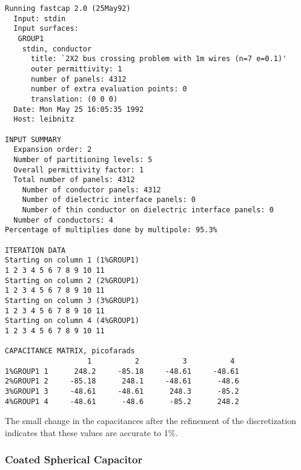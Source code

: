 \begin{verbatim}
Running fastcap 2.0 (25May92)
  Input: stdin
  Input surfaces:
   GROUP1
    stdin, conductor
      title: `2X2 bus crossing problem with 1m wires (n=7 e=0.1)'
      outer permittivity: 1
      number of panels: 4312
      number of extra evaluation points: 0
      translation: (0 0 0)
  Date: Mon May 25 16:05:35 1992
  Host: leibnitz

INPUT SUMMARY
  Expansion order: 2
  Number of partitioning levels: 5
  Overall permittivity factor: 1
  Total number of panels: 4312
    Number of conductor panels: 4312
    Number of dielectric interface panels: 0
    Number of thin conductor on dielectric interface panels: 0
  Number of conductors: 4
Percentage of multiplies done by multipole: 95.3%

ITERATION DATA
Starting on column 1 (1%GROUP1)
1 2 3 4 5 6 7 8 9 10 11
Starting on column 2 (2%GROUP1)
1 2 3 4 5 6 7 8 9 10 11
Starting on column 3 (3%GROUP1)
1 2 3 4 5 6 7 8 9 10 11
Starting on column 4 (4%GROUP1)
1 2 3 4 5 6 7 8 9 10 11

CAPACITANCE MATRIX, picofarads
                   1          2          3          4
1%GROUP1 1      248.2     -85.18     -48.61     -48.61
2%GROUP1 2     -85.18      248.1     -48.61      -48.6
3%GROUP1 3     -48.61     -48.61      248.3      -85.2
4%GROUP1 4     -48.61      -48.6      -85.2      248.2
\end{verbatim}
The small change in the capacitances after the refinement of the 
discretization indicates that these values are accurate to 1\%.

\subsubsection{Coated Spherical Capacitor}

